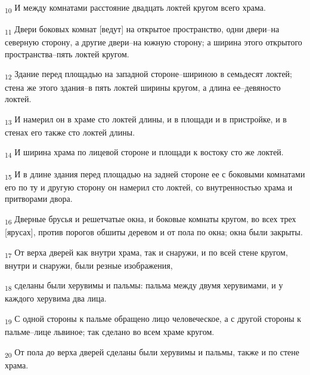 \begin{tcolorbox}
\textsubscript{10} И между комнатами расстояние двадцать локтей кругом всего храма.
\end{tcolorbox}
\begin{tcolorbox}
\textsubscript{11} Двери боковых комнат [ведут] на открытое пространство, одни двери--на северную сторону, а другие двери--на южную сторону; а ширина этого открытого пространства--пять локтей кругом.
\end{tcolorbox}
\begin{tcolorbox}
\textsubscript{12} Здание перед площадью на западной стороне--шириною в семьдесят локтей; стена же этого здания--в пять локтей ширины кругом, а длина ее--девяносто локтей.
\end{tcolorbox}
\begin{tcolorbox}
\textsubscript{13} И намерил он в храме сто локтей длины, и в площади и в пристройке, и в стенах его также сто локтей длины.
\end{tcolorbox}
\begin{tcolorbox}
\textsubscript{14} И ширина храма по лицевой стороне и площади к востоку сто же локтей.
\end{tcolorbox}
\begin{tcolorbox}
\textsubscript{15} И в длине здания перед площадью на задней стороне ее с боковыми комнатами его по ту и другую сторону он намерил сто локтей, со внутренностью храма и притворами двора.
\end{tcolorbox}
\begin{tcolorbox}
\textsubscript{16} Дверные брусья и решетчатые окна, и боковые комнаты кругом, во всех трех [ярусах], против порогов обшиты деревом и от пола по окна; окна были закрыты.
\end{tcolorbox}
\begin{tcolorbox}
\textsubscript{17} От верха дверей как внутри храма, так и снаружи, и по всей стене кругом, внутри и снаружи, были резные изображения,
\end{tcolorbox}
\begin{tcolorbox}
\textsubscript{18} сделаны были херувимы и пальмы: пальма между двумя херувимами, и у каждого херувима два лица.
\end{tcolorbox}
\begin{tcolorbox}
\textsubscript{19} С одной стороны к пальме обращено лицо человеческое, а с другой стороны к пальме--лице львиное; так сделано во всем храме кругом.
\end{tcolorbox}
\begin{tcolorbox}
\textsubscript{20} От пола до верха дверей сделаны были херувимы и пальмы, также и по стене храма.
\end{tcolorbox}
